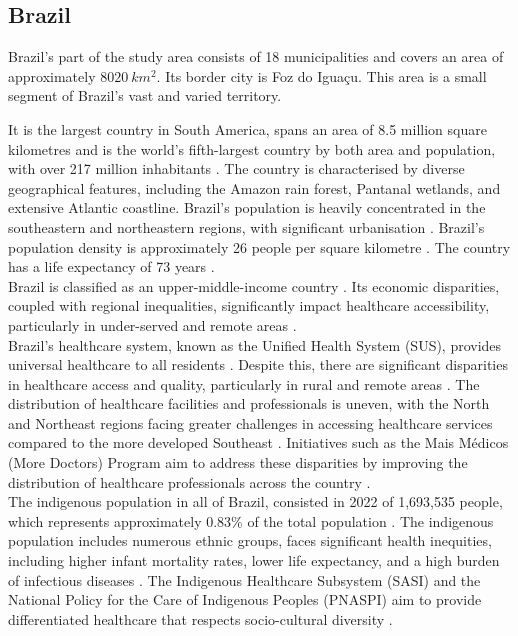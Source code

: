 \documentclass[11pt, a4paper]{report}
\begin{document}
\subsection{Brazil}
Brazil's part of the study area consists of  18 municipalities and covers an area of approximately $8020 \ km^2$. Its border city is Foz do Iguaçu. This area is a small segment of Brazil's vast and varied territory.

It is the largest country in South America, spans an area of 8.5 million square kilometres \citet{runfola_geoboundaries_2020} and is the world's fifth-largest country by both area and population, with over 217 million inhabitants \citet{united_nations_world_2022}. The country is characterised by diverse geographical features, including the Amazon rain forest, Pantanal wetlands, and extensive Atlantic coastline. Brazil's population is heavily concentrated in the southeastern and northeastern regions, with significant urbanisation \citet{agencia_de_noticias_-_ibge_between_2023}. Brazil's population density is approximately 26 people per square kilometre \citet{united_nations_world_2022}. The country has a life expectancy of 73 years \citet{world_bank_life_2022}.  \\
%
Brazil is classified as an upper-middle-income country \citet{world_bank_world_2022}. Its economic disparities, coupled with regional inequalities, significantly impact healthcare accessibility, particularly in under-served and remote areas \citet{hone_effect_2019}.  \\
%
Brazil's healthcare system, known as the Unified Health System (SUS), provides universal healthcare to all residents \citet{oliveira_challenges_2017}. Despite this, there are significant disparities in healthcare access and quality, particularly in rural and remote areas \citet{palmeira_analysis_2022}. The distribution of healthcare facilities and professionals is uneven, with the North and Northeast regions facing greater challenges in accessing healthcare services compared to the more developed Southeast \citet{silva_emergency_2021}. Initiatives such as the Mais Médicos (More Doctors) Program aim to address these disparities by improving the distribution of healthcare professionals across the country \citet{oliveira_challenges_2017}. \\
%
The indigenous population in all of Brazil, consisted  in 2022  of 1,693,535 people, which represents approximately 0.83\% of the total population \citet{berger_indigenous_2024}. The indigenous population includes numerous ethnic groups, faces significant health inequities, including higher infant mortality rates, lower life expectancy, and a high burden of infectious diseases \citet{berger_indigenous_2024} \citet{santos_health_2022} \citet{mendes_o_2018}. The Indigenous Healthcare Subsystem (SASI) and the National Policy for the Care of Indigenous Peoples (PNASPI) aim to provide differentiated healthcare that respects socio-cultural diversity \citet{de_m_pontes_health_2020}. 
\end{document}
